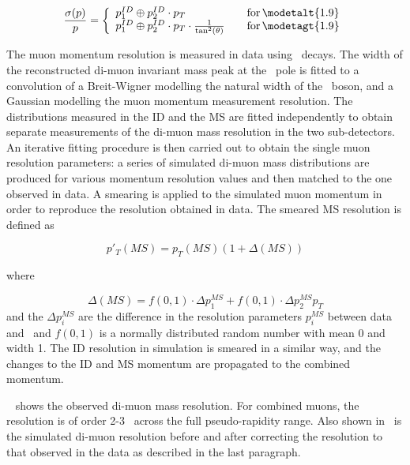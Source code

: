 \begin{equation}
\frac{ \sigma (p) }{ p } = \left\{
    \begin{array}{l l}
        p_{1}^{ID} \oplus  p_{2}^{ID} \cdot p_{T}  & \quad {\rm
for}\, \modetalt{1.9} \\
    p_{1}^{ID} \oplus  p_{2}^{ID} \cdot p_{T} \cdot
\frac{1}{\tan ^{2} (\theta)}  & \quad {\rm for}\, \modetagt{1.9} \\
  \end{array} \right.
\end{equation}

The muon momentum resolution is measured in data using \Zmm\ decays. The width
of the reconstructed di-muon invariant mass peak at the \Z\ pole is fitted to a
convolution of a Breit-Wigner modelling the natural width of the \Z\ boson, and
a Gaussian modelling the muon momentum measurement resolution. The distributions
measured in the ID and the MS are fitted independently to obtain separate
measurements of the di-muon mass resolution in the two sub-detectors.  An
iterative fitting procedure is then carried out to obtain the single muon
resolution parameters: a series of simulated di-muon mass distributions are
produced for various momentum resolution values and then matched to the one
observed in data.  A smearing is applied to the simulated muon momentum in order
to reproduce the resolution obtained in data. The smeared MS resolution is
defined as

\begin{equation}
p'_{T}(MS) = p_{T}(MS) (1+\Delta(MS))
\end{equation}

where 

\begin{equation}
\Delta(MS) = f(0,1) \cdot \Delta p_{1}^{MS} +  f(0,1) \cdot \Delta p_{2}^{MS} p_{T}
\end{equation}
and the $ \Delta p_{i}^{MS} $ are the difference in the resolution parameters $
p_{i}^{MS} $ between data and \mcsim\ and $f(0,1)$ is a normally distributed
random number with mean 0 and width 1. The ID resolution in simulation is
smeared in a similar way, and the changes to the ID and MS momentum are propagated
to the combined momentum.



~ shows the observed di-muon mass resolution. For
combined muons, the resolution is of order 2-3 \gev\ across the full
pseudo-rapidity range. Also shown in~ is the simulated
di-muon resolution before and after correcting the resolution to that observed
in the data as described in the last paragraph.


